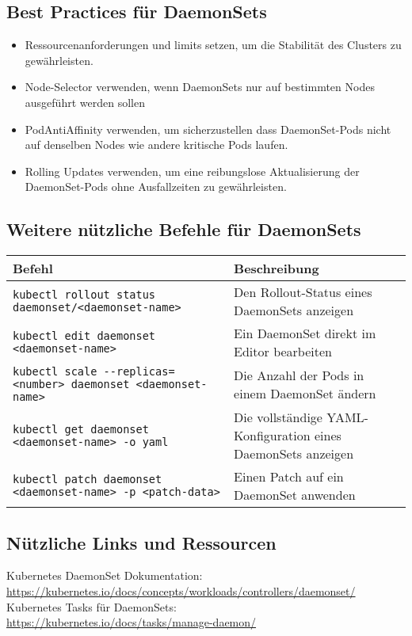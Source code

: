 \subsection{Best Practices für DaemonSets}
\begin{itemize}
    \item Ressourcenanforderungen und limits setzen, um die Stabilität des Clusters zu gewährleisten.
    \item Node-Selector verwenden, wenn DaemonSets nur auf bestimmten Nodes ausgeführt werden sollen
    \item PodAntiAffinity verwenden, um sicherzustellen dass DaemonSet-Pods nicht auf denselben Nodes wie andere kritische Pods laufen.
    \item Rolling Updates verwenden, um eine reibungslose Aktualisierung der DaemonSet-Pods ohne Ausfallzeiten zu gewährleisten.
\end{itemize}
\subsection{Weitere nützliche Befehle für DaemonSets}
\begin{tabular}{|p{}|p{}|}
\hline
\textbf{Befehl} & \textbf{Beschreibung} \\
\hline
\texttt{kubectl rollout status daemonset/<daemonset-name>} & Den Rollout-Status eines DaemonSets anzeigen \\
\texttt{kubectl edit daemonset <daemonset-name>} & Ein DaemonSet direkt im Editor bearbeiten \\
\texttt{kubectl scale {-}{-}replicas=<number> daemonset <daemonset-name>} & Die Anzahl der Pods in einem DaemonSet ändern \\
\texttt{kubectl get daemonset <daemonset-name> -o yaml} & Die vollständige YAML-Konfiguration eines DaemonSets anzeigen \\
\texttt{kubectl patch daemonset <daemonset-name> -p <patch-data>} & Einen Patch auf ein DaemonSet anwenden \\
\hline
\end{tabular}

\subsection{Nützliche Links und Ressourcen}

Kubernetes DaemonSet Dokumentation:\\
\url{https://kubernetes.io/docs/concepts/workloads/controllers/daemonset/}\\
Kubernetes Tasks für DaemonSets:\\
\url{https://kubernetes.io/docs/tasks/manage-daemon/}\\

